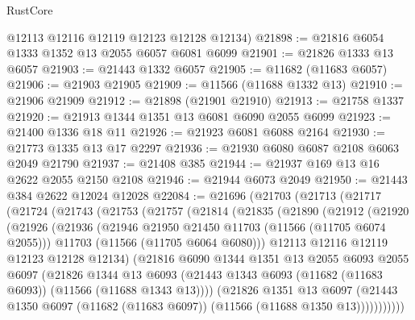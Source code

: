\begin{lexlean}{RustCore}
\begin{coremodule}
      @12113
      @12116
      @12119
      @12123
      @12128
      @12134)
@21898 := @21816 @6054 @1333 @1352 @13 @2055 @6057 @6081 @6099
@21901 := @21826 @1333 @13 @6057
@21903 := @21443 @1332 @6057
@21905 := @11682 (@11683 @6057)
@21906 := @21903 @21905
@21909 := @11566 (@11688 @1332 @13)
@21910 := @21906 @21909
@21912 := @21898 (@21901 @21910)
@21913 := @21758 @1337
@21920 := @21913 @1344 @1351 @13 @6081 @6090 @2055 @6099
@21923 := @21400 @1336 @18 @11
@21926 := @21923 @6081 @6088 @2164
@21930 := @21773 @1335 @13 @17 @2297
@21936 := @21930 @6080 @6087 @2108 @6063 @2049 @21790
@21937 := @21408 @385
@21944 := @21937 @169 @13 @16 @2622 @2055 @2150 @2108
@21946 := @21944 @6073 @2049
@21950 := @21443 @384 @2622 @12024 @12028
@22084 := @21696
    (@21703
      (@21713
        (@21717
          (@21724
            (@21743
              (@21753
                (@21757
                  (@21814
                    (@21835
                      (@21890
                        (@21912
                          (@21920
                            (@21926
                              (@21936
                                (@21946 @21950 @21450 @11703 (@11566 (@11705 @6074 @2055)))
                                @11703
                                (@11566 (@11705 @6064 @6080)))
                              @12113
                              @12116
                              @12119
                              @12123
                              @12128
                              @12134)
                            (@21816
                              @6090
                              @1344
                              @1351
                              @13
                              @2055
                              @6093
                              @2055
                              @6097
                              (@21826
                                @1344
                                @13
                                @6093
                                (@21443
                                  @1343
                                  @6093
                                  (@11682 (@11683 @6093))
                                  (@11566 (@11688 @1343 @13))))
                              (@21826
                                @1351
                                @13
                                @6097
                                (@21443
                                  @1350
                                  @6097
                                  (@11682 (@11683 @6097))
                                  (@11566 (@11688 @1350 @13)))))))))))

\end{coremodule}
\end{lexlean}
